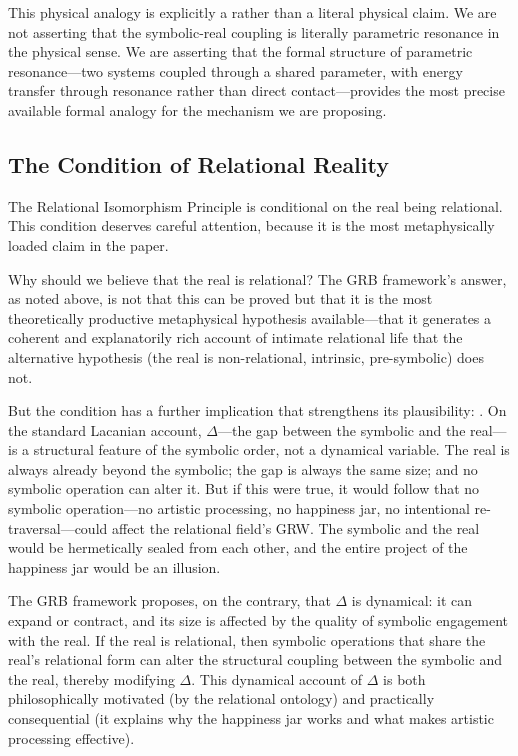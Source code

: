 This physical analogy is explicitly a  rather than a literal physical claim. We are not asserting that the symbolic-real coupling is literally parametric resonance in the physical sense. We are asserting that the formal structure of parametric resonance---two systems coupled through a shared parameter, with energy transfer through resonance rather than direct contact---provides the most precise available formal analogy for the mechanism we are proposing.

\subsection{The Condition of Relational Reality}
\label{p15:subsec:condition}

\noindent
The Relational Isomorphism Principle is conditional on the real being relational. This condition deserves careful attention, because it is the most metaphysically loaded claim in the paper.

Why should we believe that the real is relational? The GRB framework's answer, as noted above, is not that this can be proved but that it is the most theoretically productive metaphysical hypothesis available---that it generates a coherent and explanatorily rich account of intimate relational life that the alternative hypothesis (the real is non-relational, intrinsic, pre-symbolic) does not.

But the condition has a further implication that strengthens its plausibility: . On the standard Lacanian account, $\Delta$---the gap between the symbolic and the real---is a structural feature of the symbolic order, not a dynamical variable. The real is always already beyond the symbolic; the gap is always the same size; and no symbolic operation can alter it. But if this were true, it would follow that no symbolic operation---no artistic processing, no happiness jar, no intentional re-traversal---could affect the relational field's GRW. The symbolic and the real would be hermetically sealed from each other, and the entire project of the happiness jar would be an illusion.

The GRB framework proposes, on the contrary, that $\Delta$ is dynamical: it can expand or contract, and its size is affected by the quality of symbolic engagement with the real. If the real is relational, then symbolic operations that share the real's relational form can alter the structural coupling between the symbolic and the real, thereby modifying $\Delta$. This dynamical account of $\Delta$ is both philosophically motivated (by the relational ontology) and practically consequential (it explains why the happiness jar works and what makes artistic processing effective).

